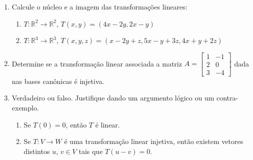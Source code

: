 \documentclass{article}
\begin{document}
\begin{enumerate}
\item Calcule o n\'ucleo e a imagem das transforma\c{c}\~oes lineares:
	\begin{enumerate}
		\item $T:\mathbb{R}^2\rightarrow\mathbb{R}^2$, $T(x, y) = (4x-2y, 2x-y)$
		\item $T:\mathbb{R}^3\rightarrow\mathbb{R}^3$, $T(x, y, z) = (x-2y+z, 5x-y+3z, 4x+y+2z)$
	\end{enumerate}

\item Determine se a transforma\c{c}\~ao linear associada a matriz
	$A=\left[\begin{array}{cc}
			1 & -1 \\
			2 & 0 \\
			3 & -4
		\end{array}\right]$
	dada nas bases can\^onicas \'e injetiva.

\item Verdadeiro ou falso. Justifique dando um argumento l\'ogico ou um contra-exemplo.
	\begin{enumerate}
		\item Se $T(0) = 0$, ent\~ao $T$ \'e linear.
		\item Se $T:V\rightarrow W$ \'e uma transforma\c{c}\~ao linear injetiva, ent\~ao existem vetores distintos $u$, $v \in V$ tais que $T(u-v)=0$.
	\end{enumerate}

\end{enumerate}
\end{document}
